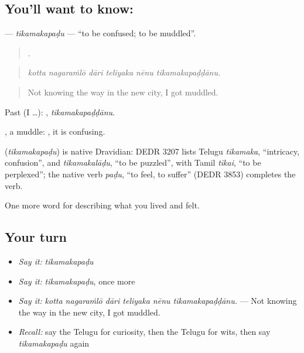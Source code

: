 \subsection*{You'll want to know: }
\textbf{} — \emph{tikamakapaḍu} — \textquotedblleft{}to be confused; to be muddled\textquotedblright{}.

\begin{quote}
     .
\end{quote}

\begin{quote}
\emph{kotta nagaraṁlō dāri teliyaka nēnu tikamakapaḍḍānu.}
\end{quote}

\begin{quote}
Not knowing the way in the new city, I got muddled.
\end{quote}

Past (I …): , \emph{tikamakapaḍḍānu}.

, a muddle:  , it is confusing.

\begin{cousinweb}
\textbf{} (\emph{tikamakapaḍu}) is native Dravidian: DEDR 3207 lists Telugu \emph{tikamaka}, \textquotedblleft{}intricacy, confusion\textquotedblright{}, and \emph{tikamakalāḍu}, \textquotedblleft{}to be puzzled\textquotedblright{}, with Tamil \emph{tikai}, \textquotedblleft{}to be perplexed\textquotedblright{}; the native verb \emph{paḍu}, \textquotedblleft{}to feel, to suffer\textquotedblright{} (DEDR 3853) completes the verb.
\end{cousinweb}

\begin{grammarlens}[title={What you've built}]
One more word for describing what you lived and felt.
\end{grammarlens}

\subsection*{Your turn}
\begin{itemize}
\raggedright
  \item \emph{Say it:} \emph{tikamakapaḍu}
  \item \emph{Say it:} \emph{tikamakapaḍu}, once more
  \item \emph{Say it:} \emph{kotta nagaraṁlō dāri teliyaka nēnu tikamakapaḍḍānu.} — Not knowing the way in the new city, I got muddled.
  \item \emph{Recall:} say the Telugu for curiosity, then the Telugu for wits, then say \emph{tikamakapaḍu} again
\end{itemize}


